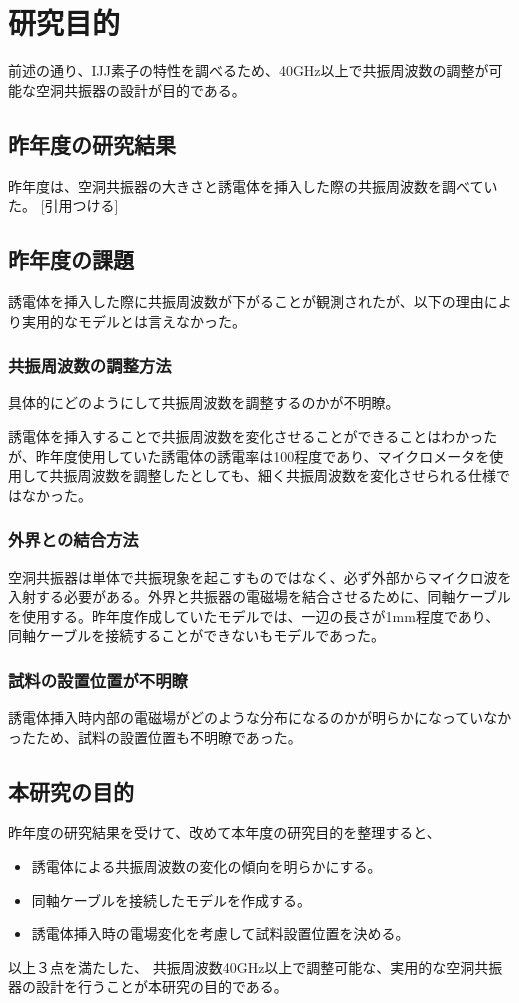 \chapter{研究目的}
前述の通り、IJJ素子の特性を調べるため、40GHz以上で共振周波数の調整が可能な空洞共振器の設計が目的である。
\section{昨年度の研究結果}
昨年度は、空洞共振器の大きさと誘電体を挿入した際の共振周波数を調べていた。 [引用つける]

\section{昨年度の課題}
誘電体を挿入した際に共振周波数が下がることが観測されたが、以下の理由により実用的なモデルとは言えなかった。
\subsection{共振周波数の調整方法}
具体的にどのようにして共振周波数を調整するのかが不明瞭。

誘電体を挿入することで共振周波数を変化させることができることはわかったが、昨年度使用していた誘電体の誘電率は100程度であり、マイクロメータを使用して共振周波数を調整したとしても、細く共振周波数を変化させられる仕様ではなかった。
\subsection{外界との結合方法}
空洞共振器は単体で共振現象を起こすものではなく、必ず外部からマイクロ波を入射する必要がある。外界と共振器の電磁場を結合させるために、同軸ケーブルを使用する。昨年度作成していたモデルでは、一辺の長さが1mm程度であり、同軸ケーブルを接続することができないもモデルであった。
\subsection{試料の設置位置が不明瞭}
誘電体挿入時内部の電磁場がどのような分布になるのかが明らかになっていなかったため、試料の設置位置も不明瞭であった。


\section{本研究の目的}
昨年度の研究結果を受けて、改めて本年度の研究目的を整理すると、

\begin{itemize}
  \item 誘電体による共振周波数の変化の傾向を明らかにする。
  \item 同軸ケーブルを接続したモデルを作成する。
  \item 誘電体挿入時の電場変化を考慮して試料設置位置を決める。
\end{itemize}

以上３点を満たした、 共振周波数40GHz以上で調整可能な、実用的な空洞共振器の設計を行うことが本研究の目的である。
